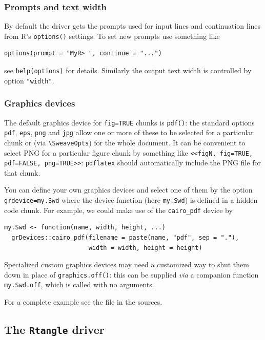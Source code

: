 \documentclass[a4paper]{article}
\begin{document}
\subsubsection{Prompts and text width}

By default the driver gets the prompts used for input lines
and continuation lines from R's \texttt{options()} settings. To set new
prompts use something like
\begin{verbatim}
options(prompt = "MyR> ", continue = "...")
\end{verbatim}
see \texttt{help(options)} for details. Similarly the output text
width is controlled by option \texttt{"width"}.


\subsubsection{Graphics devices}

The default graphics device for \texttt{fig=TRUE} chunks is
\texttt{pdf()}: the standard options \texttt{pdf}, \texttt{eps},
\texttt{png} and \texttt{jpg} allow one or more of these to be
selected for a particular chunk or (via \verb|\SweaveOpts|) for the
whole document.  It can be convenient to select PNG for a particular
figure chunk by something like
\verb|<<figN, fig=TRUE, pdf=FALSE, png=TRUE>>|: \texttt{pdflatex}
should automatically include the PNG file for that chunk.

You can define your own graphics devices and select one of them by the
option \texttt{grdevice=my.Swd} where the device function (here
\texttt{my.Swd}) is defined in a hidden code chunk. For example, we
could make use of the \texttt{cairo\_pdf} device by
\begin{verbatim}
my.Swd <- function(name, width, height, ...)
  grDevices::cairo_pdf(filename = paste(name, "pdf", sep = "."),
                       width = width, height = height)
\end{verbatim}
Specialized custom graphics devices may need a customized way to shut
them down in place of \verb|graphics.off()|: this can be supplied
\emph{via} a companion function \verb|my.Swd.off|, which is called
with no arguments.

For a complete example see the file
 in the \R{} sources.

\subsection{The \texttt{Rtangle} driver}
\end{document}
